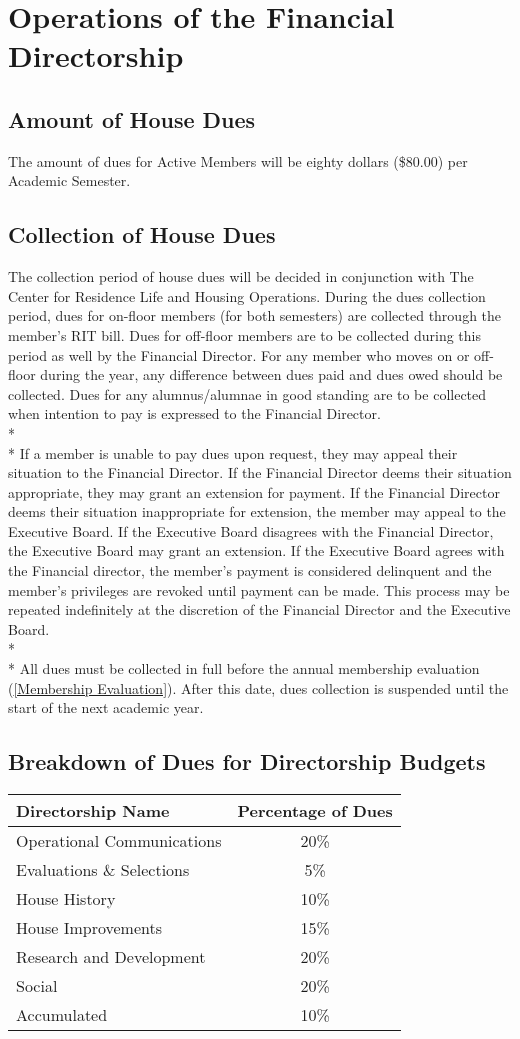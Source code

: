 \documentclass{article}
\newcommand{\bylaw}[1]{\section{#1} \label{#1}}
\newcommand{\bsection}[1]{\subsection{#1} \label{#1}}
\begin{document}
\bylaw{Operations of the Financial Directorship}
\bsection{Amount of House Dues}
The amount of dues for Active Members will be eighty dollars (\$80.00) per Academic Semester.
\bsection{Collection of House Dues}
The collection period of house dues will be decided in conjunction with The Center for Residence Life and Housing Operations.
During the dues collection period, dues for on-floor members (for both semesters) are collected through the member’s RIT bill.
Dues for off-floor members are to be collected during this period as well by the Financial Director.
For any member who moves on or off-floor during the year, any difference between dues paid and dues owed should be collected.
Dues for any alumnus/alumnae in good standing are to be collected when intention to pay is expressed to the Financial Director.
\\*\\*
If a member is unable to pay dues upon request, they may appeal their situation to the Financial Director.
If the Financial Director deems their situation appropriate, they may grant an extension for payment.
If the Financial Director deems their situation inappropriate for extension, the member may appeal to the Executive Board.
If the Executive Board disagrees with the Financial Director, the Executive Board may grant an extension.
If the Executive Board agrees with the Financial director, the member’s payment is considered delinquent and the member’s privileges are revoked until payment can be made.
This process may be repeated indefinitely at the discretion of the Financial Director and the Executive Board.
\\*\\*
All dues must be collected in full before the annual membership evaluation (\ref{Membership Evaluation}). After this date, dues collection is suspended until the start of the next academic year.
\bsection{Breakdown of Dues for Directorship Budgets}
\begin{center}
\begin{tabular}[c]{l c}
Directorship Name & Percentage of Dues \\
\hline
\hline
Operational Communications & 20\% \\
\hline
Evaluations \& Selections & 5\% \\
\hline
House History & 10\% \\
\hline
House Improvements & 15\% \\
\hline
Research and Development & 20\% \\
\hline
Social & 20\% \\
\hline
Accumulated & 10\% \\
\hline
\end{tabular}
\end{center}
\end{document}
